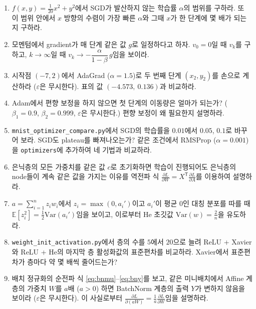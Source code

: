 \documentclass[11pt,a4paper]{article}
\newcommand{\T}{^{\mathsf T}}
\newcommand{\pd}[2]{\frac{\partial #1}{\partial #2}}
\begin{document}
\begin{enumerate}[label=\arabic*.]

\item $f(x,y)=\frac{1}{20}x^2+y^2$에서 SGD가 발산하지 않는 학습률 $\alpha$의 범위를 구하라.
또 이 범위 안에서 $x$ 방향의 수렴이 가장 빠른 $\alpha$와 그때 $x$가 한 단계에 몇 배가 되는지 구하라.

\item 모멘텀에서 gradient가 매 단계 같은 값 $g$로 일정하다고 하자.
$v_0=0$일 때 $v_k$를 구하고, $k\to\infty$일 때 $v_k\to-\dfrac{\alpha}{1-\beta}\,g$임을 보이라.

\item 시작점 $(-7,2)$에서 AdaGrad ($\alpha=1.5$)로 두 번째 단계 $(x_2,y_2)$를 손으로 계산하라
($\varepsilon$은 무시한다). 표의 값 $(-4.573,\ 0.136)$과 비교하라.

\item Adam에서 편향 보정을 하지 않으면 첫 단계의 이동량은 얼마가 되는가?
($\beta_1=0.9$, $\beta_2=0.999$, $\varepsilon$은 무시한다.) 편향 보정이 왜 필요한지 설명하라.

\item \texttt{mnist\_optimizer\_compare.py}에서 SGD의 학습률을 $0.01$에서 $0.05$, $0.1$로 바꾸어 보라.
SGD도 plateau를 빠져나오는가? 같은 조건에서 RMSProp ($\alpha=0.001$)을 \texttt{optimizers}에 추가하여
네 기법과 비교하라.

\item 은닉층의 모든 가중치를 같은 값 $c$로 초기화하면 학습이 진행되어도 은닉층의 node들이
계속 같은 값을 가지는 이유를 역전파 식 $\pd{L}{W}=X\T\pd{L}{A}$를 이용하여 설명하라.

\item $a=\sum_{i=1}^{n}z_iw_i$에서 $z_i=\max(0,a_i')$이고 $a_i'$이 평균 $0$인 대칭 분포를 따를 때
$\mathbb E[z_i^2]=\frac12\mathrm{Var}(a_i')$임을 보이고, 이로부터 He 초깃값 $\mathrm{Var}(w)=\frac2n$을 유도하라.

\item \texttt{weight\_init\_activation.py}에서 층의 수를 $5$에서 $20$으로 늘려
ReLU + Xavier와 ReLU + He의 마지막 층 활성화값의 표준편차를 비교하라.
Xavier에서 표준편차가 층마다 약 몇 배씩 줄어드는가?

\item 배치 정규화의 순전파 식 \eqref{eq:bnmu}--\eqref{eq:bny}를 보고,
같은 미니배치에서 Affine 계층의 가중치 $W$를 $a$배 ($a>0$) 하면 BatchNorm 계층의 출력 $Y$가 변하지 않음을 보이라
($\varepsilon$은 무시한다). 이 사실로부터 $\pd{L}{(aW)}=\frac1a\pd{L}{W}$임을 설명하라.


\end{enumerate}
\end{document}
